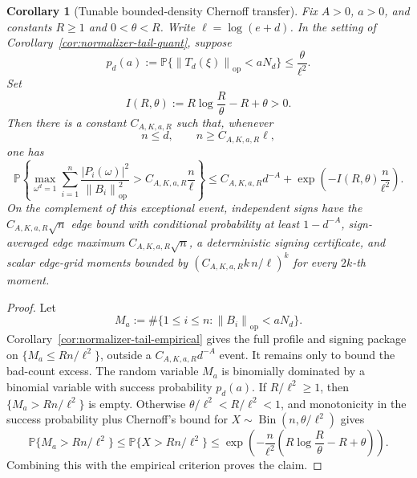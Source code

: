 \documentclass[11pt]{amsart}
\numberwithin{equation}{section}
\newtheorem{corollary}[theorem]{Corollary}
\theoremstyle{definition}
\theoremstyle{remark}
\newcommand{\op}{\mathrm{op}}
\newcommand{\Prob}{\mathbb P}
\newcommand{\norm}[1]{\left\lVert #1\right\rVert}
\newcommand{\abs}[1]{\left\lvert #1\right\rvert}
\begin{document}
\begin{corollary}[Tunable bounded-density Chernoff transfer]
\label{cor:normalizer-tail-chernoff-density}
Fix \(A>0\), \(a>0\), and constants \(R\ge1\) and \(0<\theta<R\).  Write
\(\ell=\log(e+d)\).  In the setting of
Corollary~\ref{cor:normalizer-tail-quant}, suppose
\[
  p_d(a):=\Prob\{\norm{T_d(\xi)}_{\op}<aN_d\}\le \frac{\theta}{\ell^2}.
\]
Set
\[
  I(R,\theta):=R\log\frac R\theta-R+\theta>0 .
\]
Then there is a constant \(C_{A,K,a,R}\) such that, whenever
\[
  n\le d,\qquad n\ge C_{A,K,a,R}\ell ,
\]
one has
\[
  \Prob\left\{
  \max_{\omega^d=1}
  \sum_{i=1}^n
  \frac{\abs{P_i(\omega)}^2}{\norm{B_i}_{\op}^2}
  > C_{A,K,a,R}\frac n\ell
  \right\}
  \le C_{A,K,a,R}d^{-A}
     +\exp\left(-I(R,\theta)\frac n{\ell^2}\right).
\]
On the complement of this exceptional event, independent signs have the
\(C_{A,K,a,R}\sqrt n\) edge bound with conditional probability at least
\(1-d^{-A}\), sign-averaged edge maximum \(C_{A,K,a,R}\sqrt n\), a
deterministic signing certificate, and scalar edge-grid moments bounded by
\((C_{A,K,a,R}k\,n/\ell)^k\) for every \(2k\)-th moment.
\end{corollary}

\begin{proof}
Let
\[
  M_a:=\#\{1\le i\le n:\norm{B_i}_{\op}<aN_d\}.
\]
Corollary~\ref{cor:normalizer-tail-empirical} gives the full profile and
signing package on \(\{M_a\le Rn/\ell^2\}\), outside a
\(C_{A,K,a,R}d^{-A}\) event.  It remains only to bound the bad-count excess.
The random variable \(M_a\) is binomially dominated by a binomial variable with
success probability \(p_d(a)\).  If \(R/\ell^2\ge1\), then
\(\{M_a>Rn/\ell^2\}\) is empty.  Otherwise \(\theta/\ell^2<R/\ell^2<1\), and
monotonicity in the success probability plus Chernoff's bound for
\(X\sim\operatorname{Bin}(n,\theta/\ell^2)\) gives
\[
  \Prob\{M_a>Rn/\ell^2\}
  \le \Prob\{X>Rn/\ell^2\}
  \le
  \exp\left(-\frac n{\ell^2}
  \left(R\log\frac R\theta-R+\theta\right)\right).
\]
Combining this with the empirical criterion proves the claim.
\end{proof}
\end{document}
